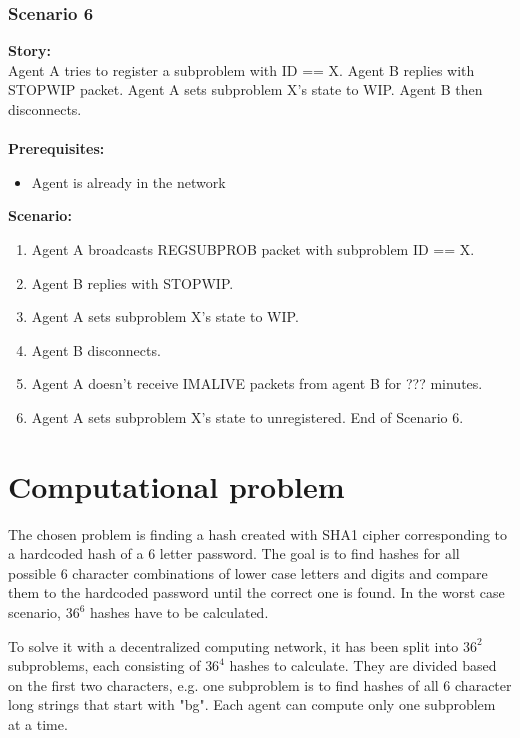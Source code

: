 \documentclass{article}
\begin{document}
\subsubsection{Scenario 6}
\noindent\textbf{Story:} \\
Agent A tries to register a subproblem with ID == X. Agent B replies with STOPWIP packet. Agent A sets subproblem X's state to WIP. Agent B then disconnects. \\\\
\textbf{Prerequisites:}
\begin{itemize}
    \item Agent is already in the network
\end{itemize}
\textbf{Scenario:}
\begin{enumerate}
    \item Agent A broadcasts REGSUBPROB packet with subproblem ID == X.
    \item Agent B replies with STOPWIP.
    \item Agent A sets subproblem X's state to WIP.
    \item Agent B disconnects.
    \item Agent A doesn't receive IMALIVE packets from agent B for ??? minutes.
    \item Agent A sets subproblem X's state to unregistered. End of Scenario 6.
\end{enumerate}

\section{Computational problem}
The chosen problem is finding a hash created with SHA1 cipher corresponding to a hardcoded hash of a 6 letter password.
The goal is to find hashes for all possible 6 character combinations of lower case letters and digits and compare them to the hardcoded password until the correct one is found.
In the worst case scenario, $36^6$ hashes have to be calculated.

To solve it with a decentralized computing network, it has been split into $36^2$ subproblems,
each consisting of $36^4$ hashes to calculate. They are divided based on the first two characters,
e.g. one subproblem is to find hashes of all 6 character long strings that start with "bg".
Each agent can compute only one subproblem at a time.
\end{document}
